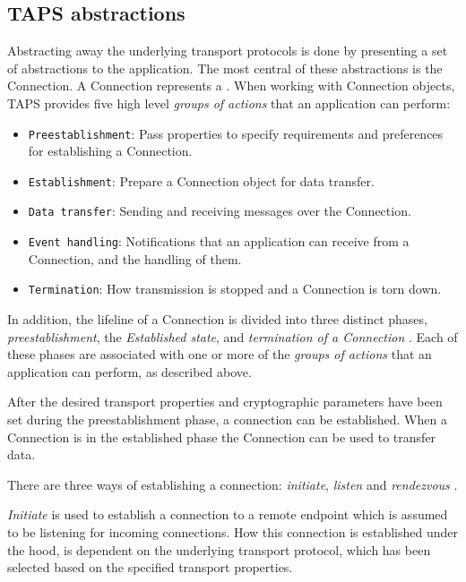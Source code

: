 \subsection{TAPS abstractions}
Abstracting away the underlying transport protocols is done by
presenting a set of abstractions to the application. The most
central of these abstractions is the Connection. A Connection
represents a 
\cite{welzlUsageTransportFeatures2018}.
When working with Connection objects, TAPS provides five high
level \textit{groups of actions} that an application can perform:
\begin{itemize}
    \item \texttt{Preestablishment}: Pass properties to specify
        requirements and preferences for establishing a Connection.
    \item \texttt{Establishment}: Prepare a Connection object for data
        transfer.
    \item \texttt{Data transfer}: Sending and receiving messages
        over the Connection.
    \item \texttt{Event handling}: Notifications that an application
        can receive from a Connection, and the handling of them.
    \item \texttt{Termination}: How transmission is stopped and
        a Connection is torn down.
\end{itemize}

In addition, the lifeline of a Connection is divided into three distinct
phases, \textit{preestablishment}, the \textit{Established state}, and 
\textit{termination of a Connection} \cite{paulyArchitectureRequirementsTransport2025}.
Each of these phases are associated
with one or more of the \textit{groups of actions} that an application can perform,
as described above. 

After the desired transport properties and cryptographic parameters have
been set during the preestablishment phase, a connection can be established. 
When a Connection is in the established phase the Connection can be used to
transfer data. 

There are three ways of
establishing a connection: \textit{initiate}, \textit{listen} and
\textit{rendezvous} \cite{paulyArchitectureRequirementsTransport2025}.

\textit{Initiate} is used to establish a connection to a remote endpoint which
is assumed to be listening for incoming connections. How this connection
is established under the hood, is dependent on the underlying transport
protocol, which has been selected based on the specified transport properties.

